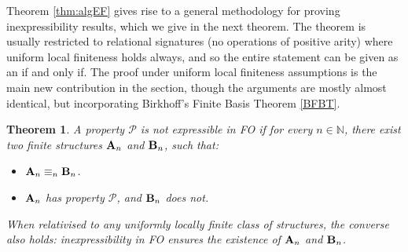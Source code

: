 \documentclass[reqno]{amsart}
\theoremstyle{plain}
\newtheorem{thm}{Theorem}[section]
\theoremstyle{definition}
\newcommand{\up}[1]{\textup{#1}}
\begin{document}
Theorem \ref{thm:algEF} gives rise to a general methodology for proving inexpressibility results, which we give in the next theorem.  The  theorem is usually restricted to relational signatures (no operations of positive arity) where uniform local finiteness holds always, and so the entire statement can be given as an if and only if.  The proof under uniform local finiteness assumptions is the main new contribution in the section, though the arguments are mostly almost identical, but incorporating Birkhoff's Finite Basis Theorem \ref{BFBT}.
\begin{thm}\label{thm:meth}
A property $\mathcal{P}$ is not expressible in FO if for every $n\in \mathbb{N}$, there exist two finite structures ${\bf A}_n$ and ${\bf B}_n$, such that\up:
\begin{itemize}
\item ${\bf A}_n\equiv_n{\bf B}_n$.
\item ${\bf A}_n$ has property $\mathcal{P}$, and ${\bf B}_n$ does not.
\end{itemize}
When relativised to any uniformly locally finite class of structures, the converse also holds\up: inexpressibility in FO ensures the existence of ${\bf A}_n$ and ${\bf B}_n$.
\end{thm}
    
\end{document}
